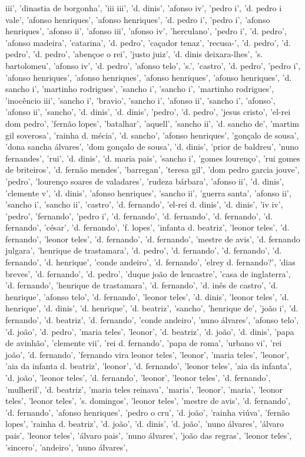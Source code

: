 \documentclass{article}
\begin{document}
\begin{itemize}
iii', 'dinastia de borgonha', 'iii iii', 'd. dinis', 'afonso iv', 'pedro i', 'd. pedro i vale', 'afonso henriques', 'afonso henriques', 'd. pedro i', 'pedro i', 'afonso henriques', 'afonso ii', 'afonso iii', 'afonso iv', 'herculano', 'pedro i', 'd. pedro', 'afonso madeira', 'catarina', 'd. pedro', 'caçador tenaz', 'recusa-', 'd. pedro', 'd. pedro', 'd. pedro', 'abençoe o rei', 'justo juiz', 'd. dinis deixara-lhes', 's. bartolomeu', 'afonso iv', 'd. pedro', 'afonso telo', 's.', 'castro', 'd. pedro', 'pedro i', 'afonso henriques', 'afonso henriques', 'afonso henriques', 'afonso henriques', 'd. sancho i', 'martinho rodrigues', 'sancho i', 'sancho i', 'martinho rodrigues', 'inocêncio iii', 'sancho i', 'bravio', 'sancho i', 'afonso ii', 'sancho i', 'afonso', 'afonso ii', 'sancho', 'd. dinis', 'd. dinis', 'pedro', 'd. pedro', 'jesus cristo', 'el-rei dom pedro', 'fernão lopes', 'batalhar', 'aquell', 'sancho ii', 'd. sancho de', 'martim gil soverosa', 'rainha d. mécia', 'd. sancho', 'afonso henriques', 'gonçalo de sousa', 'dona sancha álvares', 'dom gonçalo de sousa', 'd. dinis', 'prior de baldreu', 'nuno fernandes', 'rui', 'd. dinis', 'd. maria pais', 'sancho i', 'gomes lourenço', 'rui gomes de briteiros', 'd. fernão mendes', 'barregan', 'teresa gil', 'dom pedro garcia jouve', 'pedro', 'lourenço soares de valadares', 'rudeza bárbara', 'afonso ii', 'd. dinis', 'clemente v', 'd. dinis', 'afonso henriques', 'sancho ii', 'guerra santa', 'afonso ii', 'sancho i', 'sancho ii', 'castro', 'd. fernando', 'el-rei d. dinis', 'd. dinis', 'iv iv', 'pedro', 'fernando', 'pedro i', 'd. fernando', 'd. fernando', 'd. fernando', 'd. fernando', 'césar', 'd. fernando', 'f. lopes', 'infanta d. beatriz', 'leonor teles', 'd. fernando', 'leonor teles', 'd. fernando', 'd. fernando', 'mestre de avis', 'd. fernando julgara', 'henrique de trastamara', 'd. pedro', 'd. fernando', 'd. fernando', 'd. fernando', 'd. henrique', 'conde andeiro', 'd. fernando', 'elrey d. fernando?', 'dias breves', 'd. fernando', 'd. pedro', 'duque joão de lencastre', 'casa de inglaterra', 'd. fernando', 'henrique de trastamara', 'd. fernando', 'd. inês de castro', 'd. henrique', 'afonso telo', 'd. fernando', 'leonor teles', 'd. dinis', 'leonor teles', 'd. henrique', 'd. dinis', 'd. henrique', 'd. beatriz', 'sancho', 'henrique de', 'joão i', 'd. fernando', 'd. beatriz', 'd. fernando', 'conde andeiro', 'nuno álvares', 'afonso telo', 'd. joão', 'd. pedro', 'maria teles', 'leonor', 'd. beatriz', 'd. joão', 'd. dinis', 'papa de avinhão', 'clemente vii', 'rei d. fernando', 'papa de roma', 'urbano vi', 'rei joão', 'd. fernando', 'fernando vira leonor teles', 'leonor', 'maria teles', 'leonor', 'aia da infanta d. beatriz', 'leonor', 'd. fernando', 'leonor teles', 'aia da infanta', 'd. joão', 'leonor teles', 'd. fernando', 'leonor', 'leonor teles', 'd. fernando', 'mulheril', 'd. beatriz', 'maria teles reinava', 'maria', 'leonor', 'maria', 'leonor teles', 'leonor teles', 's. domingos', 'leonor teles', 'mestre de avis', 'd. fernando', 'd. fernando', 'afonso henriques', 'pedro o cru', 'd. joão', 'rainha viúva', 'fernão lopes', 'rainha d. beatriz', 'd. joão', 'd. dinis', 'd. joão', 'nuno álvares', 'álvaro pais', 'leonor teles', 'álvaro pais', 'nuno álvares', 'joão das regras', 'leonor teles', 'sincero', 'andeiro', 'nuno álvares', 
\end{itemize}
\end{document}
